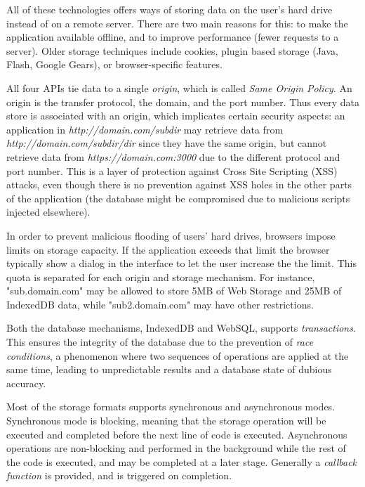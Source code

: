 All of these technologies offers ways of storing data on the user's hard drive instead of on a remote server. There are two main reasons for this: to make the application available offline, and to improve performance (fewer requests to a server). Older storage techniques include cookies, plugin based storage (Java, Flash, Google Gears), or browser-specific features.

All four APIs tie data to a single \emph{origin}, which is called \emph{Same Origin Policy}. An origin is the transfer protocol, the domain, and the port number. Thus every data store is associated with an origin, which implicates certain security aspects: an application in \emph{http://domain.com/subdir} may retrieve data from \emph{http://domain.com/subdir/dir} since they have the same origin, but cannot retrieve data from \emph{https://domain.com:3000} due to the different protocol and port number. This is a layer of protection against Cross Site Scripting (XSS) attacks, even though there is no prevention against XSS holes in the other parts of the application (the database might be compromised due to malicious scripts injected elsewhere).

In order to prevent malicious flooding of users' hard drives, browsers impose limits on storage capacity. If the application exceeds that limit the browser typically show a dialog in the interface to let the user increase the the limit. This quota is separated for each origin and storage mechanism. For instance, "sub.domain.com" may be allowed to store 5MB of Web Storage and 25MB of IndexedDB data, while "sub2.domain.com" may have other restrictions.

Both the database mechanisms, IndexedDB and WebSQL, supports \emph{transactions}. This ensures the integrity of the database due to the prevention of \emph{race conditions}, a phenomenon where two sequences of operations are applied at the same time, leading to unpredictable results and a database state of dubious accuracy.

Most of the storage formats supports synchronous and asynchronous modes. Synchronous mode is blocking, meaning that the storage operation will be executed and completed before the next line of code is executed. Asynchronous operations are non-blocking and performed in the background while the rest of the code is executed, and may be completed at a later stage. Generally a \emph{callback function} is provided, and is triggered on completion.


